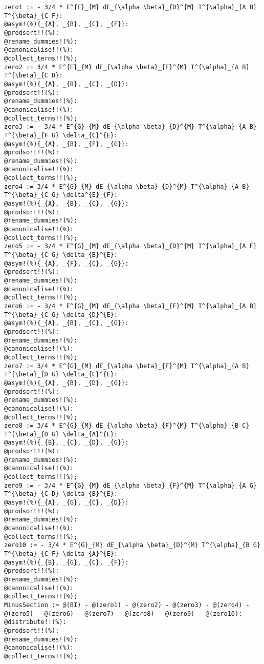 \documentclass[11pt]{article}
\begin{document}
{\color[named]{Blue}\begin{verbatim}
zero1 := - 3/4 * E^{E}_{M} dE_{\alpha \beta}_{D}^{M} T^{\alpha}_{A B} T^{\beta}_{C F}:
@asym!(%){_{A}, _{B}, _{C}, _{F}}:
@prodsort!!(%):
@rename_dummies!(%):
@canonicalise!!(%):
@collect_terms!!(%);
zero2 := 3/4 * E^{E}_{M} dE_{\alpha \beta}_{F}^{M} T^{\alpha}_{A B} T^{\beta}_{C D}:
@asym!(%){_{A}, _{B}, _{C}, _{D}}:
@prodsort!!(%):
@rename_dummies!(%):
@canonicalise!!(%):
@collect_terms!!(%);
zero3 := - 3/4 * E^{G}_{M} dE_{\alpha \beta}_{D}^{M} T^{\alpha}_{A B} T^{\beta}_{F G} \delta_{C}^{E}:
@asym!(%){_{A}, _{B}, _{F}, _{G}}:
@prodsort!!(%):
@rename_dummies!(%):
@canonicalise!!(%):
@collect_terms!!(%);
zero4 := 3/4 * E^{G}_{M} dE_{\alpha \beta}_{D}^{M} T^{\alpha}_{A B} T^{\beta}_{C G} \delta^{E}_{F}:
@asym!(%){_{A}, _{B}, _{C}, _{G}}:
@prodsort!!(%):
@rename_dummies!(%):
@canonicalise!!(%):
@collect_terms!!(%);
zero5 := - 3/4 * E^{G}_{M} dE_{\alpha \beta}_{D}^{M} T^{\alpha}_{A F} T^{\beta}_{C G} \delta_{B}^{E}:
@asym!(%){_{A}, _{F}, _{C}, _{G}}:
@prodsort!!(%):
@rename_dummies!(%):
@canonicalise!!(%):
@collect_terms!!(%);
zero6 := - 3/4 * E^{G}_{M} dE_{\alpha \beta}_{F}^{M} T^{\alpha}_{A B} T^{\beta}_{C G} \delta_{D}^{E}:
@asym!(%){_{A}, _{B}, _{C}, _{G}}:
@prodsort!!(%):
@rename_dummies!(%):
@canonicalise!!(%):
@collect_terms!!(%);
zero7 := 3/4 * E^{G}_{M} dE_{\alpha \beta}_{F}^{M} T^{\alpha}_{A B} T^{\beta}_{D G} \delta_{C}^{E}:
@asym!(%){_{A}, _{B}, _{D}, _{G}}:
@prodsort!!(%):
@rename_dummies!(%):
@canonicalise!!(%):
@collect_terms!!(%);
zero8 := 3/4 * E^{G}_{M} dE_{\alpha \beta}_{F}^{M} T^{\alpha}_{B C} T^{\beta}_{D G} \delta_{A}^{E}:
@asym!(%){_{B}, _{C}, _{D}, _{G}}:
@prodsort!!(%):
@rename_dummies!(%):
@canonicalise!!(%):
@collect_terms!!(%);
zero9 := - 3/4 * E^{G}_{M} dE_{\alpha \beta}_{F}^{M} T^{\alpha}_{A G} T^{\beta}_{C D} \delta_{B}^{E}:
@asym!(%){_{A}, _{G}, _{C}, _{D}}:
@prodsort!!(%):
@rename_dummies!(%):
@canonicalise!!(%):
@collect_terms!!(%);
zero10 := - 3/4 * E^{G}_{M} dE_{\alpha \beta}_{D}^{M} T^{\alpha}_{B G} T^{\beta}_{C F} \delta_{A}^{E}:
@asym!(%){_{B}, _{G}, _{C}, _{F}}:
@prodsort!!(%):
@rename_dummies!(%):
@canonicalise!!(%):
@collect_terms!!(%);
MinusSection := @(BI) - @(zero1) - @(zero2) - @(zero3) - @(zero4) - @(zero5) - @(zero6) - @(zero7) - @(zero8) - @(zero9) - @(zero10):
@distribute!!(%):
@prodsort!!(%):
@rename_dummies!(%):
@canonicalise!!(%):
@collect_terms!!(%);
\end{verbatim}}
\end{document}
